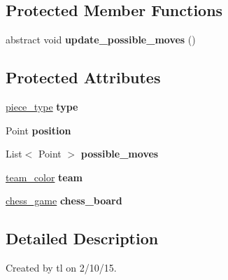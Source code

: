 \subsection*{Protected Member Functions}
\begin{DoxyCompactItemize}
\item 
\hypertarget{classchess__core_1_1chess__piece_a884b073a0e40e68bf0e1a670df307755}{}abstract void {\bfseries update\+\_\+possible\+\_\+moves} ()\label{classchess__core_1_1chess__piece_a884b073a0e40e68bf0e1a670df307755}

\end{DoxyCompactItemize}
\subsection*{Protected Attributes}
\begin{DoxyCompactItemize}
\item 
\hypertarget{classchess__core_1_1chess__piece_ab8be2da54759e79e10ffc8ee3b391773}{}\hyperlink{enumchess__core_1_1piece__type}{piece\+\_\+type} {\bfseries type}\label{classchess__core_1_1chess__piece_ab8be2da54759e79e10ffc8ee3b391773}

\item 
\hypertarget{classchess__core_1_1chess__piece_af35cb6eadaebeebec1f6eff9d6db3c38}{}Point {\bfseries position}\label{classchess__core_1_1chess__piece_af35cb6eadaebeebec1f6eff9d6db3c38}

\item 
\hypertarget{classchess__core_1_1chess__piece_a09d4544e8fc841454daafc9cdb29ca6c}{}List$<$ Point $>$ {\bfseries possible\+\_\+moves}\label{classchess__core_1_1chess__piece_a09d4544e8fc841454daafc9cdb29ca6c}

\item 
\hypertarget{classchess__core_1_1chess__piece_a828388a4dec818013f2fa78b2cb01b9c}{}\hyperlink{enumchess__core_1_1team__color}{team\+\_\+color} {\bfseries team}\label{classchess__core_1_1chess__piece_a828388a4dec818013f2fa78b2cb01b9c}

\item 
\hypertarget{classchess__core_1_1chess__piece_a1ede1fdde8149ddfea0056fc45ed5c71}{}\hyperlink{classchess__core_1_1chess__game}{chess\+\_\+game} {\bfseries chess\+\_\+board}\label{classchess__core_1_1chess__piece_a1ede1fdde8149ddfea0056fc45ed5c71}

\end{DoxyCompactItemize}


\subsection{Detailed Description}
Created by tl on 2/10/15.

